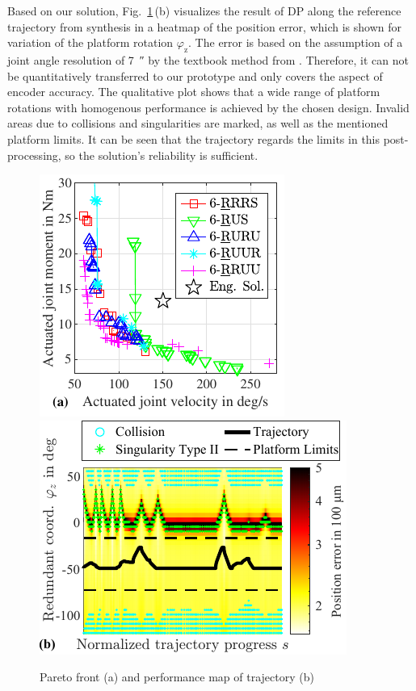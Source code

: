 \documentclass[runningheads,hidelinks]{llncs}
\begin{document}
Based on our solution, Fig.~\ref{fig:synthesis_results}\,(b) visualizes the result of DP along the reference trajectory from synthesis in a heatmap of the position error, which is shown for variation of the platform rotation $\varphi_\text{z}$. 
The error is based on the assumption of a joint angle resolution of \SI{7}{\arcsecond} by the textbook method from \cite{Merlet2006}. Therefore, it can not be quantitatively transferred to our prototype and only covers the aspect of encoder accuracy. 
The qualitative plot shows that a wide range of platform rotations with homogenous performance is achieved by the chosen design.
Invalid areas due to collisions and singularities are marked, as well as the mentioned platform limits. 
It can be seen that the trajectory regards the limits in this post-processing, so the solution's reliability is sufficient.
\begin{figure}[tb]
	\centering
	\vspace{-5mm}
	\includegraphics[trim=0 3 0 0]{pareto_all_actforceactvelo_small.pdf} %
	\hspace{0.4cm} %
	\includegraphics{perfmap_positionerror_obj_actforceactvelo_small.pdf}
	\caption{Pareto front (a) and performance map of trajectory (b)}
	\label{fig:synthesis_results}
	\vspace{-5mm}
\end{figure}
\end{document}
